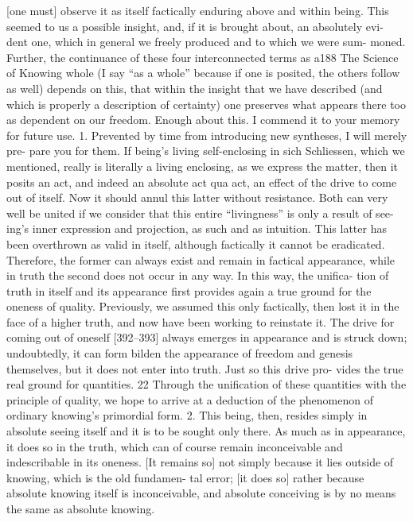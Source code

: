 [one must] observe it as itself factically enduring above and within being. This
seemed to us a possible insight, and, if it is brought about, an absolutely evi-
dent one, which in general we freely produced and to which we were sum-
moned. Further, the continuance of these four interconnected terms as a188
The Science of Knowing
whole (I say “as a whole” because if one is posited, the others follow as well)
depends on this, that within the insight that we have described (and which is
properly a description of certainty) one preserves what appears there too as
dependent on our freedom.
Enough about this. I commend it to your memory for future use.
1. Prevented by time from introducing new syntheses, I will merely pre-
pare you for them. If being’s living self-enclosing {in sich Schliessen}, which we
mentioned, really is literally a living enclosing, as we express the matter, then it
posits an act, and indeed an absolute act qua act, an effect of the drive to come
out of itself. Now it should annul this latter without resistance. Both can very
well be united if we consider that this entire “livingness” is only a result of see-
ing’s inner expression and projection, as such and as intuition. This latter has
been overthrown as valid in itself, although factically it cannot be eradicated.
Therefore, the former can always exist and remain in factical appearance,
while in truth the second does not occur in any way. In this way, the unifica-
tion of truth in itself and its appearance first provides again a true ground for
the oneness of quality. Previously, we assumed this only factically, then lost it
in the face of a higher truth, and now have been working to reinstate it. The
drive for coming out of oneself [392–393] always emerges in appearance and
is struck down; undoubtedly, it can form {bilden} the appearance of freedom
and genesis themselves, but it does not enter into truth. Just so this drive pro-
vides the true real ground for quantities. 22 Through the unification of these
quantities with the principle of quality, we hope to arrive at a deduction of the
phenomenon of ordinary knowing’s primordial form.
2. This being, then, resides simply in absolute seeing itself and it is to be
sought only there. As much as in appearance, it does so in the truth, which can
of course remain inconceivable and indescribable in its oneness. [It remains
so] not simply because it lies outside of knowing, which is the old fundamen-
tal error; [it does so] rather because absolute knowing itself is inconceivable,
and absolute conceiving is by no means the same as absolute knowing.
